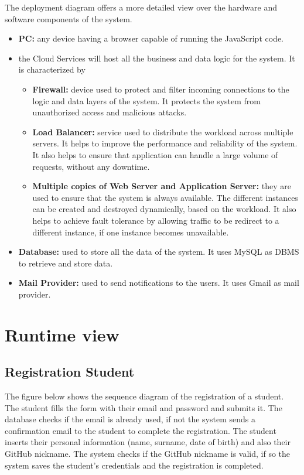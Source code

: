 The deployment diagram offers a more detailed view over the hardware and software components of the system. 
\begin{itemize}
    \item  \textbf{PC: }any device having a browser capable of running the JavaScript code.
    \item   the Cloud Services will host all the business and data logic for the system. It is characterized by 
    \begin{itemize}
        \item  \textbf{Firewall:} device used to protect and filter incoming connections to the logic and data layers of the system. It protects the system from unauthorized access and malicious attacks.
        \item  \textbf{Load Balancer:} service used to distribute the workload across multiple servers. It helps to improve the performance and reliability of the system. It also helps to ensure that application can handle a large volume of requests, without any downtime.
        \item  \textbf{Multiple copies of Web Server and Application Server:} they are used to ensure that the system is always available. The different instances can be created and destroyed dynamically, based on the workload. It also helps to achieve fault tolerance by allowing traffic to be redirect to a different instance, if one instance becomes unavailable.
    \end{itemize}
    \item   \textbf{Database:} used to store all the data of the system. It uses MySQL as DBMS to retrieve and store data.
    \item   \textbf{Mail Provider: } used to send notifications to the users. It uses Gmail as mail provider.
\end{itemize}

\section{Runtime view}
\subsection{Registration Student}
The figure below shows the sequence diagram of the registration of a student. The student fills the form with their email and password and submits it. 
The database checks if the email is already used, if not the system sends a confirmation email to the student to complete the registration. 
The student inserts their personal information (name, surname, date of birth) and also their GitHub nickname. 
The system checks if the GitHub nickname is valid, if so the system saves the student's credentials and the registration is completed.\\

